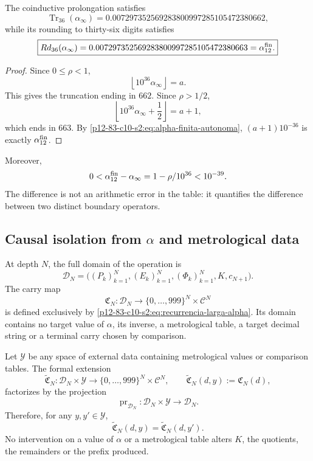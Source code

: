\begin{theorem}
\label{p12-83-c10-s2:thm:frontera-alpha-662-663}
The coinductive prolongation satisfies
\[
 \boxed{
 \operatorname{Tr}_{36}(\alpha_\infty)
 =0.007297352569283800997285105472380662,}
\]
while its rounding to thirty-six digits satisfies
\[
 \boxed{
 \operatorname{Rd}_{36}(\alpha_\infty)
 =0.007297352569283800997285105472380663
 =\alpha_{12}^{\rm fin}.}
\]
\end{theorem}

\begin{proof}
Since \(0\leq\rho<1\),
\[
 \left\lfloor10^{36}\alpha_\infty\right\rfloor=a.
\]
This gives the truncation ending in \(662\). Since \(\rho>1/2\),
\[
 \left\lfloor10^{36}\alpha_\infty+\frac12\right\rfloor=a+1,
\]
which ends in \(663\). By \eqref{p12-83-c10-s2:eq:alpha-finita-autonoma},
\((a+1)10^{-36}\) is exactly \(\alpha_{12}^{\rm fin}\).
\end{proof}

Moreover,
\[
 0<\alpha_{12}^{\rm fin}-\alpha_\infty
 =\frac{1-\rho}{10^{36}}<10^{-39}.
\]
The difference is not an arithmetic error in the table: it quantifies the
difference between two distinct boundary operators.

\subsection{Causal isolation from \texorpdfstring{\(\alpha\)}{alpha} and metrological data}

At depth \(N\), the full domain of the operation is
\[
 \mathscr D_N
 =\bigl((P_k)_{k=1}^{N},(E_k)_{k=1}^{N},
        (\Phi_k)_{k=1}^{N},K,c_{N+1}\bigr).
\]
The carry map
\[
 \mathfrak C_N:\mathscr D_N
 \longrightarrow
 \{0,\ldots,999\}^{N}\times\mathcal C^{N}
\]
is defined exclusively by \eqref{p12-83-c10-s2:eq:recurrencia-larga-alpha}. Its
domain contains no target value of \(\alpha\), its inverse, a metrological
table, a target decimal string or a terminal carry chosen by
comparison.

\begin{theorem}
\label{p12-83-c10-s2:thm:no-interferencia-metrologica-alpha}
Let \(\mathscr Y\) be any space of external data containing metrological
values or comparison tables. The formal extension
\[
 \widetilde{\mathfrak C}_N:
 \mathscr D_N\times\mathscr Y
 \longrightarrow
 \{0,\ldots,999\}^{N}\times\mathcal C^{N},
 \qquad
 \widetilde{\mathfrak C}_N(d,y):=\mathfrak C_N(d),
\]
factorizes by the projection
\[
 \operatorname{pr}_{\mathscr D_N}:
 \mathscr D_N\times\mathscr Y\longrightarrow\mathscr D_N.
\]
Therefore, for any \(y,y'\in\mathscr Y\),
\[
 \widetilde{\mathfrak C}_N(d,y)
 =\widetilde{\mathfrak C}_N(d,y').
\]
No intervention on a value of \(\alpha\) or a metrological
table alters \(K\), the quotients, the remainders or the prefix produced.
\end{theorem}

